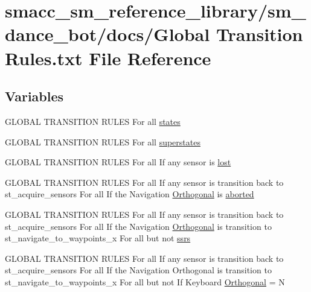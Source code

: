 \hypertarget{Global_01Transition_01Rules_8txt}{}\section{smacc\+\_\+sm\+\_\+reference\+\_\+library/sm\+\_\+dance\+\_\+bot/docs/\+Global Transition Rules.\+txt File Reference}
\label{Global_01Transition_01Rules_8txt}
\subsection*{Variables}
\begin{DoxyCompactItemize}
\item 
G\+L\+O\+B\+AL T\+R\+A\+N\+S\+I\+T\+I\+ON R\+U\+L\+ES For all \hyperlink{Global_01Transition_01Rules_8txt_a54d1602740c77675ed14ebfe688f4374}{states}
\item 
G\+L\+O\+B\+AL T\+R\+A\+N\+S\+I\+T\+I\+ON R\+U\+L\+ES For all \hyperlink{Global_01Transition_01Rules_8txt_af31ae27f561335eed0d5161d8ee256f8}{superstates}
\item 
G\+L\+O\+B\+AL T\+R\+A\+N\+S\+I\+T\+I\+ON R\+U\+L\+ES For all If any sensor is \hyperlink{Global_01Transition_01Rules_8txt_a21166d43cc40d1ae31189d3fe91d8346}{lost}
\item 
G\+L\+O\+B\+AL T\+R\+A\+N\+S\+I\+T\+I\+ON R\+U\+L\+ES For all If any sensor is transition back to st\+\_\+acquire\+\_\+sensors For all If the Navigation \hyperlink{Global_01Transition_01Rules_8txt_a2e1cdec29dad5013e514270d0a78fe22}{Orthogonal} is \hyperlink{Global_01Transition_01Rules_8txt_a682ac6cc3cf2eeec69ad3f310ae363ea}{aborted}
\item 
G\+L\+O\+B\+AL T\+R\+A\+N\+S\+I\+T\+I\+ON R\+U\+L\+ES For all If any sensor is transition back to st\+\_\+acquire\+\_\+sensors For all If the Navigation \hyperlink{Global_01Transition_01Rules_8txt_a2e1cdec29dad5013e514270d0a78fe22}{Orthogonal} is transition to st\+\_\+navigate\+\_\+to\+\_\+waypoints\+\_\+x For all but not \hyperlink{Global_01Transition_01Rules_8txt_aa881c6a22397113c3342bf4c44212934}{ssrs}
\item 
G\+L\+O\+B\+AL T\+R\+A\+N\+S\+I\+T\+I\+ON R\+U\+L\+ES For all If any sensor is transition back to st\+\_\+acquire\+\_\+sensors For all If the Navigation Orthogonal is transition to st\+\_\+navigate\+\_\+to\+\_\+waypoints\+\_\+x For all but not If Keyboard \hyperlink{Global_01Transition_01Rules_8txt_a2e1cdec29dad5013e514270d0a78fe22}{Orthogonal} = N

\end{DoxyCompactItemize}
